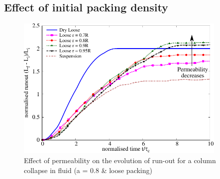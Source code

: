 \clearpage
\subsection{Effect of initial packing density}

\begin{figure}
\centering
\includegraphics[width=0.9\textwidth]{Runout_a08_loose}
\caption{Effect of permeability on the evolution of run-out for a column 
collapse in fluid (a = 0.8 \& loose packing)}
\label{fig:Runout_a08_loose}
\end{figure}

